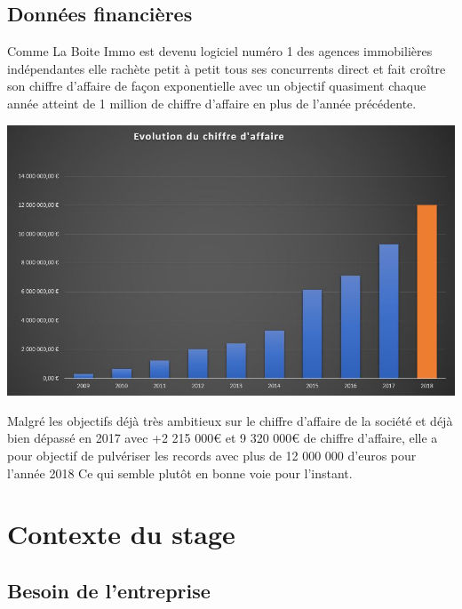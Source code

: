\documentclass[12pt]{article}
\begin{document}
\newpage

\subsection{Données financières}
Comme La Boite Immo est devenu logiciel numéro 1 des agences immobilières indépendantes elle rachète petit à petit tous ses concurrents direct et fait croître son chiffre d'affaire de façon exponentielle avec un objectif quasiment chaque année atteint de 1 million de chiffre d'affaire en plus de l'année précédente.
\vspace{0.5cm}

\begin{center} \includegraphics[scale = 0.5]{GraphCA.JPG} \end{center}

\vspace{0.5cm}
Malgré les objectifs déjà très ambitieux sur le chiffre d'affaire de la société  et déjà bien dépassé en 2017 avec +2 215 000€ et 9 320 000€ de chiffre d'affaire, elle a pour objectif de pulvériser les records avec plus de 12 000 000 d'euros pour l'année 2018 Ce qui semble plutôt en bonne voie pour l'instant.

\newpage

\section{Contexte du stage}
\subsection{Besoin de l'entreprise}
\end{document}
